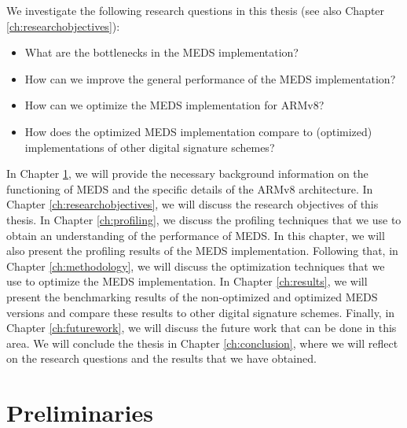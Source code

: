 \documentclass[11pt,a4paper]{report}
\theoremstyle{definition}
\begin{document}
We investigate the following research questions in this thesis (see also Chapter \ref{ch:researchobjectives}):
\begin{itemize}
  \item What are the bottlenecks in the MEDS implementation?
  \item How can we improve the general performance of the MEDS implementation?
  \item How can we optimize the MEDS implementation for ARMv8?
  \item How does the optimized MEDS implementation compare to (optimized) implementations of other digital signature schemes?
\end{itemize}

In Chapter \ref{ch:preliminaries}, we will provide the necessary background information on the functioning of MEDS and the specific details of the ARMv8 architecture. In Chapter \ref{ch:researchobjectives}, we will discuss the research objectives of this thesis. In Chapter \ref{ch:profiling}, we discuss the profiling techniques that we use to obtain an understanding of the performance of MEDS. In this chapter, we will also present the profiling results of the MEDS implementation. Following that, in Chapter \ref{ch:methodology}, we will discuss the optimization techniques that we use to optimize the MEDS implementation. In Chapter \ref{ch:results}, we will present the benchmarking results of the non-optimized and optimized MEDS versions and compare these results to other digital signature schemes. Finally, in Chapter \ref{ch:futurework}, we will discuss the future work that can be done in this area. We will conclude the thesis in Chapter \ref{ch:conclusion}, where we will reflect on the research questions and the results that we have obtained.

\chapter{Preliminaries}
\label{ch:preliminaries}
\end{document}
